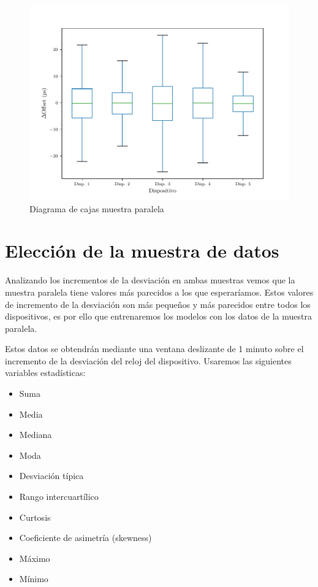 \begin{figure}
    \centering
    \includegraphics[scale=0.7]{../Python/plots/parallel/boxplot_no_out}
    \caption{Diagrama de cajas muestra paralela}
    \label{fig:box_paralelo}
\end{figure}

\section{Elección de la muestra de datos}

Analizando los incrementos de la desviación en ambas muestras vemos que la muestra paralela tiene valores más parecidos a los que esperaríamos. Estos valores de incremento de la desviación son más pequeños y más parecidos entre todos los dispositivos, es por ello que entrenaremos los modelos con los datos de la muestra paralela.

Estos datos se obtendrán mediante una ventana deslizante de \SI{1}{} minuto sobre el incremento de la desviación del reloj del dispositivo. Usaremos las siguientes variables estadísticas:
\begin{multicols}{2}
    \begin{itemize}
        \item Suma
        \item Media
        \item Mediana
        \item Moda
        \item Desviación típica
        \item Rango intercuartílico
        \item Curtosis
        \item Coeficiente de asimetría (skewness)
        \item Máximo
        \item Mínimo
    \end{itemize}
\end{multicols}

